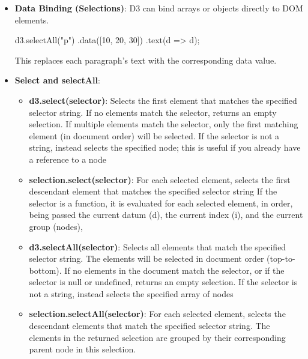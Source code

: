 \documentclass{report}
\begin{document}
\begin{itemize}
\begin{jscode}
{                return svg.node();
            }
            \end{jscode}
        \item \textbf{Data Binding (Selections)}: D3 can bind arrays or objects directly to DOM elements.
            \bigbreak \noindent 
            \begin{jscode}
                d3.selectAll("p")
                .data([10, 20, 30])
                .text(d => d);
            \end{jscode}
            \bigbreak \noindent 
            This replaces each paragraph’s text with the corresponding data value.
        \item \textbf{Select and selectAll}:
            \begin{itemize}
                \item \textbf{d3.select(selector)}: Selects the first element that matches the specified selector string. If no elements match the selector, returns an empty selection. If multiple elements match the selector, only the first matching element (in document order) will be selected. 
                    \bigbreak \noindent 
                    If the selector is not a string, instead selects the specified node; this is useful if you already have a reference to a node
                \item \textbf{selection.select(selector)}: For each selected element, selects the first descendant element that matches the specified selector string
                    \bigbreak \noindent 
                    If the selector is a function, it is evaluated for each selected element, in order, being passed the current datum (d), the current index (i), and the current group (nodes),
                \item \textbf{d3.selectAll(selector)}: Selects all elements that match the specified selector string. The elements will be selected in document order (top-to-bottom). If no elements in the document match the selector, or if the selector is null or undefined, returns an empty selection.
                    \bigbreak \noindent 
                    If the selector is not a string, instead selects the specified array of nodes
                \item \textbf{selection.selectAll(selector)}: For each selected element, selects the descendant elements that match the specified selector string. The elements in the returned selection are grouped by their corresponding parent node in this selection.
            \end{itemize}

\end{itemize}
\end{document}
